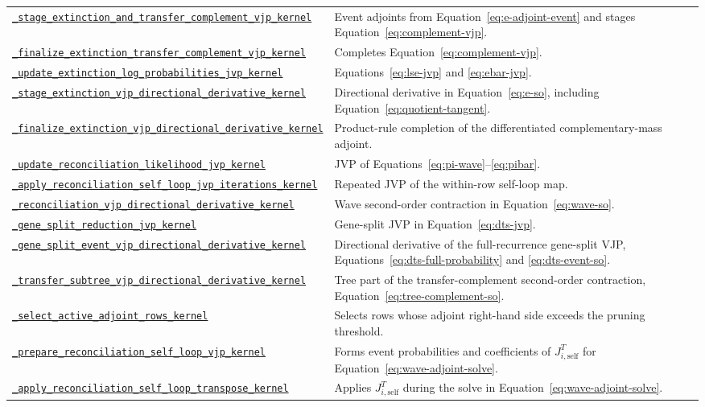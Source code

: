 \documentclass[11pt]{article}
\newcommand{\kernelref}[2]{\href{../../gpurec/core/kernels/#1}{\nolinkurl{#2}}}
\begin{document}
\begin{longtable}{>{\raggedright\arraybackslash}p{}
                  >{\raggedright\arraybackslash}p{}}
\kernelref{e_step.py}{_stage_extinction_and_transfer_complement_vjp_kernel} & Event adjoints from Equation~\eqref{eq:e-adjoint-event} and stages Equation~\eqref{eq:complement-vjp}. \\
\kernelref{e_step.py}{_finalize_extinction_transfer_complement_vjp_kernel} & Completes Equation~\eqref{eq:complement-vjp}. \\
\kernelref{e_step_tangent.py}{_update_extinction_log_probabilities_jvp_kernel} & Equations~\eqref{eq:lse-jvp} and \eqref{eq:ebar-jvp}. \\
\kernelref{e_step_so.py}{_stage_extinction_vjp_directional_derivative_kernel} & Directional derivative in Equation~\eqref{eq:e-so}, including Equation~\eqref{eq:quotient-tangent}. \\
\kernelref{e_step_so.py}{_finalize_extinction_vjp_directional_derivative_kernel} & Product-rule completion of the differentiated complementary-mass adjoint. \\
\kernelref{wave_tangent.py}{_update_reconciliation_likelihood_jvp_kernel} & JVP of Equations~\eqref{eq:pi-wave}--\eqref{eq:pibar}. \\
\kernelref{wave_tangent.py}{_apply_reconciliation_self_loop_jvp_iterations_kernel} & Repeated JVP of the within-row self-loop map. \\
\kernelref{wave_so.py}{_reconciliation_vjp_directional_derivative_kernel} & Wave second-order contraction in Equation~\eqref{eq:wave-so}. \\
\kernelref{dts_tangent.py}{_gene_split_reduction_jvp_kernel} & Gene-split JVP in Equation~\eqref{eq:dts-jvp}. \\
\kernelref{dts_so.py}{_gene_split_event_vjp_directional_derivative_kernel} & Directional derivative of the full-recurrence gene-split VJP, Equations~\eqref{eq:dts-full-probability} and \eqref{eq:dts-event-so}. \\
\kernelref{dts_so.py}{_transfer_subtree_vjp_directional_derivative_kernel} & Tree part of the transfer-complement second-order contraction, Equation~\eqref{eq:tree-complement-so}. \\
\kernelref{wave_backward_kernels.py}{_select_active_adjoint_rows_kernel} & Selects rows whose adjoint right-hand side exceeds the pruning threshold. \\
\kernelref{wave_backward_kernels.py}{_prepare_reconciliation_self_loop_vjp_kernel} & Forms event probabilities and coefficients of $J_{i,\mathrm{self}}^T$ for Equation~\eqref{eq:wave-adjoint-solve}. \\
\kernelref{wave_backward_kernels.py}{_apply_reconciliation_self_loop_transpose_kernel} & Applies $J_{i,\mathrm{self}}^T$ during the solve in Equation~\eqref{eq:wave-adjoint-solve}. \\

\end{longtable}
\end{document}

